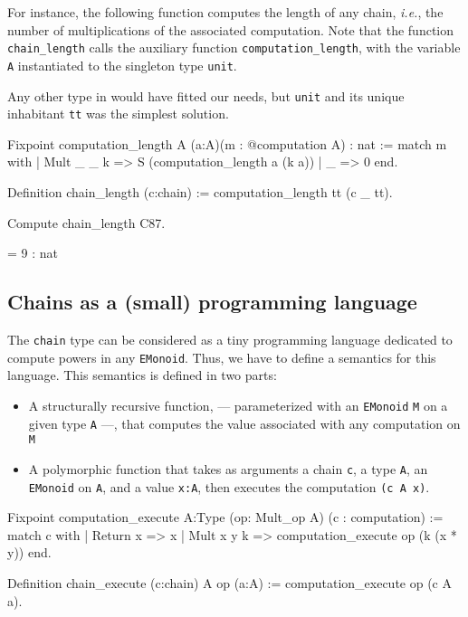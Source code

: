 For instance, the following function computes the length of any chain,
\emph{i.e.}, the number of multiplications of the associated computation.
Note that the function \texttt{chain\_length} calls the auxiliary function
\texttt{computation\_length}, with the variable \texttt{A} instantiated to the singleton type  \texttt{unit}. 

Any other type in \coq{} would have fitted our needs, but \texttt{unit} and
its unique inhabitant \texttt{tt} was the simplest  solution.

\label{C87-length}
\begin{Coqsrc}
Fixpoint computation_length {A} (a:A)(m : @computation A) 
  : nat :=
match m with
  | Mult _ _ k => S (computation_length a (k a))
  | _ => 0%
end.

Definition chain_length (c:chain) 
   := computation_length tt (c _ tt).

Compute chain_length C87.
\end{Coqsrc}
\begin{Coqanswer}
 = 9 : nat  
\end{Coqanswer}
   

\subsection{Chains as a (small) programming language}

The \texttt{chain} type can be considered as a tiny programming language dedicated to compute powers in any \texttt{EMonoid}. Thus, we have to define a semantics for this language. This semantics is defined in two parts:
\begin{itemize}
\item A structurally recursive function,  --- parameterized with an \texttt{EMonoid} \texttt{M} on a given type \texttt{A} ---, that computes the value associated with any computation on \texttt{M}
\item A polymorphic function that takes as arguments  a  chain \texttt{c},
 a type \texttt{A},  an \texttt{EMonoid} on \texttt{A}, and 
   a value \texttt{x:A},
  then executes the computation \texttt{(c A x)}.
\end{itemize}


\begin{Coqsrc}
Fixpoint computation_execute  {A:Type} (op: Mult_op A) 
                              (c : computation) :=
match c with 
| Return x => x 
| Mult x y k => computation_execute op (k (x * y))
end.

Definition chain_execute (c:chain) {A} op  (a:A) :=
  computation_execute op (c A a).
\end{Coqsrc}

